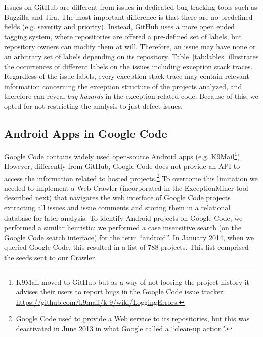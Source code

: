 Issues on GitHub are different from issues in dedicated bug tracking tools such as 
Bugzilla and Jira. The most important difference is that there are no predefined fields
  (e.g. severity and priority). Instead, GitHub uses a more open ended tagging system, where
repositories are offered a pre-defined set of labels, but repository owners can modify 
them at will. Therefore, an issue may have none or an arbitrary set of labels depending 
on its repository. Table~\ref{tab:lables} illustrates the occurrences of different labels 
on the issues including exception stack traces. Regardless of the issue labels, every exception stack
trace may contain relevant information concerning the exception structure of the
projects analyzed, and therefore can reveal \emph{bug hazards} in the exception-related code.
Because of this, we opted for not restricting the analysis to just defect issues.


\subsection{Android Apps in Google Code}
Google Code contains widely used open-source Android apps (e.g. K9Mail\footnote{K9Mail moved to GitHub but as a way of not loosing the project history it advises their users to report bugs in the Google Code issue tracker: \url{https://github.com/k9mail/k-9/wiki/LoggingErrors.}}).
However, differently from GitHub, Google Code does not provide an API to access the information related
 to hosted projects.\footnote{Google Code used to provide a Web service to its repositories, but this was deactivated in June 2013 in what Google called a ``clean-up action''.}
To overcome this limitation we needed to implement a Web Crawler (incorporated in the ExceptionMiner tool described next) that navigates 
 the web interface of Google Code projects extracting all issues and issue comments and storing them in a relational database for later analysis.
To identify Android projects on Google Code, we performed a similar heuristic: we performed a case insensitive search 
(on the Google Code search interface) for the term ``android''. In January 2014, when we queried Google Code, this resulted in a list of 788  projects. This list comprised the seeds sent to our Crawler.


